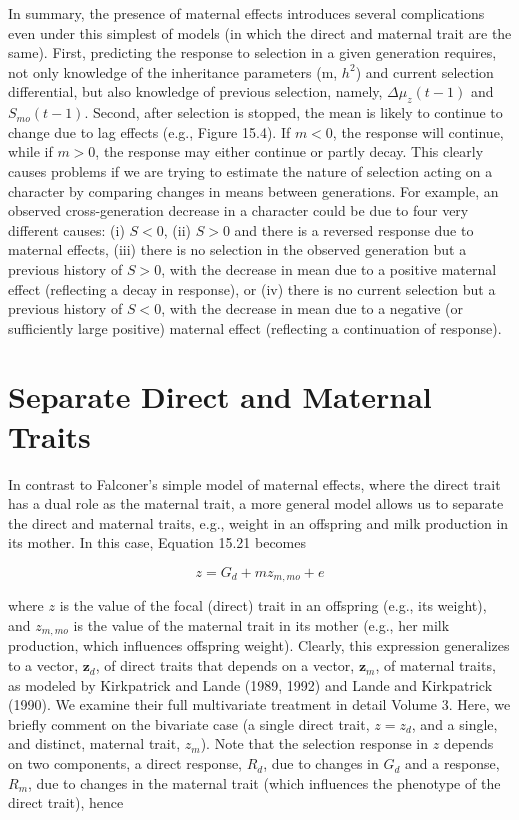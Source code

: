 \documentclass{article}
\begin{document}
In summary, the presence of maternal effects introduces several complications even under this simplest of models (in which the direct and maternal trait are the same). First, predicting the response to selection in a given generation requires, not only knowledge of the inheritance parameters (m,  $ h^2 $) and current selection differential, but also knowledge of previous selection, namely,  $ \Delta\mu_z(t-1) $ and  $ S_{mo}(t-1) $. Second, after selection is stopped, the mean is likely to continue to change due to lag effects (e.g., Figure 15.4). If  $ m < 0 $, the response will continue, while if  $ m > 0 $, the response may either continue or partly decay. This clearly causes problems if we are trying to estimate the nature of selection acting on a character by comparing changes in means between generations. For example, an observed cross-generation decrease in a character could be due to four very different causes: (i)  $ S < 0 $, (ii)  $ S > 0 $ and there is a reversed response due to maternal effects, (iii) there is no selection in the observed generation but a previous history of  $ S > 0 $, with the decrease in mean due to a positive maternal effect (reflecting a decay in response), or (iv) there is no current selection but a previous history of  $ S < 0 $, with the decrease in mean due to a negative (or sufficiently large positive) maternal effect (reflecting a continuation of response).

\section{Separate Direct and Maternal Traits}
In contrast to Falconer’s simple model of maternal effects, where the direct trait has a dual role as the maternal trait, a more general model allows us to separate the direct and maternal traits, e.g., weight in an offspring and milk production in its mother. In this case, Equation 15.21 becomes

\begin{equation}
z=G_{d}+m z_{m,m o}+e
\tag{15.35a}
\label{eq:15_35a}
\end{equation}

where $z$ is the value of the focal (direct) trait in an offspring (e.g., its weight), and $z_{m,mo}$ is the value of the maternal trait in its mother (e.g., her milk production, which influences offspring weight). Clearly, this expression generalizes to a vector, $\mathbf{z}_d$, of direct traits that depends on a vector, $\mathbf{z}_m$, of maternal traits, as modeled by Kirkpatrick and Lande (1989, 1992) and Lande and Kirkpatrick (1990). We examine their full multivariate treatment in detail Volume 3. Here, we briefly comment on the bivariate case (a single direct trait, $z = z_d$, and a single, and distinct, maternal trait, $z_m$). Note that the selection response in $z$ depends on two components, a direct response, $R_d$, due to changes in $G_d$ and a response, $R_m$, due to changes in the maternal trait (which influences the phenotype of the direct trait), hence
\end{document}
